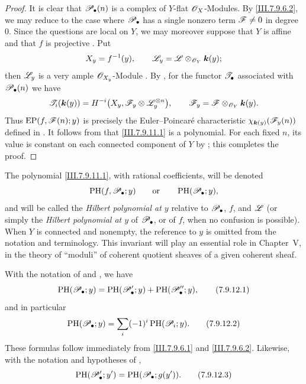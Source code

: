 \begin{proof}
It is clear that $\mathscr{P}_\bullet(n)$ is a complex of
$Y$-flat $\mathscr{O}_X$-Modules.  By
\eqref{III.7.9.6.2}, we may reduce to the case where
$\mathscr{P}_\bullet$ has a single nonzero term
$\mathscr{F}\neq0$ in degree $0$.  Since the questions are
local on $Y$, we may moreover suppose that $Y$ is affine
and that $f$ is projective .  Put
\[
  X_y=f^{-1}(y),\qquad
  \mathscr{L}_y=\mathscr{L}\otimes_{\mathscr{O}_Y}\boldsymbol{k}(y);
\]
then $\mathscr{L}_y$ is a very ample $\mathscr{O}_{X_y}$-Module
.  By , for the
functor $\mathscr{T}_\bullet$ associated with
$\mathscr{P}_\bullet(n)$ we have
\[
  \mathscr{T}_i(\boldsymbol{k}(y))
  =
  H^{-i}\bigl(
    X_y,\mathscr{F}_y\otimes\mathscr{L}_y^{\otimes n}\bigr),
  \qquad
  \mathscr{F}_y=\mathscr{F}\otimes_{\mathscr{O}_Y}\boldsymbol{k}(y).
\]
Thus $\operatorname{EP}(f,\mathscr{F}(n);y)$ is precisely the
Euler--Poincar\'e characteristic
$\chi_{\boldsymbol{k}(y)}(\mathscr{F}_y(n))$ defined in
.  It follows from  that
\eqref{III.7.9.11.1} is a polynomial.  For each fixed
$n$, its value is constant on each connected component of
$Y$ by ; this completes the proof.
\end{proof}

\begin{env}[7.9.12]
\label{III.7.9.12}
The polynomial \eqref{III.7.9.11.1}, with rational
coefficients, will be denoted
\[
  \operatorname{PH}(f,\mathscr{P}_\bullet;y)
  \qquad\text{or}\qquad
  \operatorname{PH}(\mathscr{P}_\bullet;y),
\]
and will be called the \emph{Hilbert polynomial at $y$}
relative to $\mathscr{P}_\bullet$, $f$, and $\mathscr{L}$ (or simply
the \emph{Hilbert polynomial at $y$} of
$\mathscr{P}_\bullet$, or of $f$, when no confusion is
possible).  When $Y$ is connected and nonempty, the
reference to $y$ is omitted from the notation and
terminology.  This invariant will play an essential role
in Chapter~V, in the theory of ``moduli'' of coherent
quotient sheaves of a given coherent sheaf.

With the notation of  and
, we have
\[
  \operatorname{PH}(\mathscr{P}_\bullet;y)
  =
  \operatorname{PH}(\mathscr{P}'_\bullet;y)
  +
  \operatorname{PH}(\mathscr{P}''_\bullet;y),
  \tag{7.9.12.1}\label{III.7.9.12.1}
\]
and in particular
\[
  \operatorname{PH}(\mathscr{P}_\bullet;y)
  =
  \sum_i(-1)^i\operatorname{PH}(\mathscr{P}_i;y).
  \tag{7.9.12.2}\label{III.7.9.12.2}
\]
These formulas follow immediately from
\eqref{III.7.9.6.1} and \eqref{III.7.9.6.2}.  Likewise,
with the notation and hypotheses of ,
\[
  \operatorname{PH}(\mathscr{P}'_\bullet;y')
  =
  \operatorname{PH}(\mathscr{P}_\bullet;g(y')).
  \tag{7.9.12.3}\label{III.7.9.12.3}
\]
\end{env}

